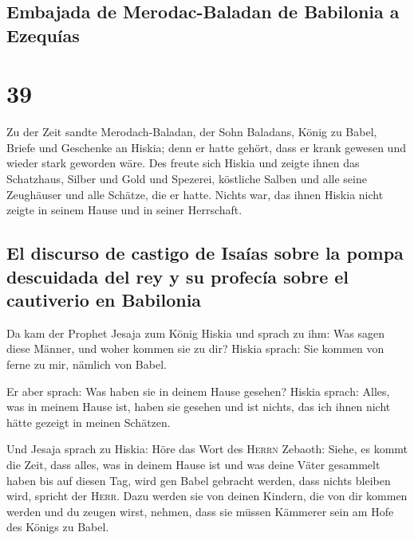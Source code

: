 \hypertarget{embajada-de-merodac-baladan-de-babilonia-a-ezequuxedas}{%
\subsection{Embajada de Merodac-Baladan de Babilonia a
Ezequías}\label{embajada-de-merodac-baladan-de-babilonia-a-ezequuxedas}}

\hypertarget{section-38}{%
\section{39}\label{section-38}}

 Zu der Zeit sandte Merodach-Baladan, der Sohn Baladans,
König zu Babel, Briefe und Geschenke an Hiskia; denn er hatte gehört,
dass er krank gewesen und wieder stark geworden wäre.  Des
freute sich Hiskia und zeigte ihnen das Schatzhaus, Silber und Gold und
Spezerei, köstliche Salben und alle seine Zeughäuser und alle Schätze,
die er hatte. Nichts war, das ihnen Hiskia nicht zeigte in seinem Hause
und in seiner Herrschaft.

\hypertarget{el-discurso-de-castigo-de-isauxedas-sobre-la-pompa-descuidada-del-rey-y-su-profecuxeda-sobre-el-cautiverio-en-babilonia}{%
\subsection{El discurso de castigo de Isaías sobre la pompa descuidada
del rey y su profecía sobre el cautiverio en
Babilonia}\label{el-discurso-de-castigo-de-isauxedas-sobre-la-pompa-descuidada-del-rey-y-su-profecuxeda-sobre-el-cautiverio-en-babilonia}}

 Da kam der Prophet Jesaja zum König Hiskia und sprach zu
ihm: Was sagen diese Männer, und woher kommen sie zu dir? Hiskia sprach:
Sie kommen von ferne zu mir, nämlich von Babel.

 Er aber sprach: Was haben sie in deinem Hause gesehen?
Hiskia sprach: Alles, was in meinem Hause ist, haben sie gesehen und ist
nichts, das ich ihnen nicht hätte gezeigt in meinen Schätzen.

 Und Jesaja sprach zu Hiskia: Höre das Wort des
\textsc{Herrn} Zebaoth:  Siehe, es kommt die Zeit, dass
alles, was in deinem Hause ist und was deine Väter gesammelt haben bis
auf diesen Tag, wird gen Babel gebracht werden, dass nichts bleiben
wird, spricht der \textsc{Herr}.  Dazu werden sie von
deinen Kindern, die von dir kommen werden und du zeugen wirst, nehmen,
dass sie müssen Kämmerer sein am Hofe des Königs zu Babel.

